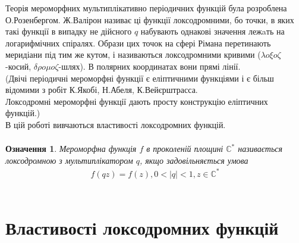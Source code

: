 \documentclass[12pt,a4paper]{article}
\begin{document}
Теорія мероморфних мультиплікативно періодичних функцій була розроблена О.Розенбергом. Ж.Валірон називає ці функції локсодромними, бо точки, в яких такі функції в випадку не дійсного $q$ набувають однакові значення лежaть на логарифмічних спіралях. Образи цих точок на сфері Рімана перетинають меридіани під тим же кутом, і називаються локсодромними кривими ($\lambda o \xi o\zeta$-косий, $\delta \rho o \mu o\zeta$-шлях). В полярних координатах вони прямі лінії.\\
(Двічі періодичні мероморфні функції є еліптичними функціями і є більш відомими з робіт К.Якобі, Н.Абеля, К.Вейєрштрасса.\\
Локсодромні мероморфні функції дають просту конструкцію еліптичних функцій.)\\
В цій роботі вивчаються властивості локсодромних функцій.
\[\begin{array}{l}
\end{array} \]

\newtheorem{ozn}{Означення}
\begin{ozn}
 Мероморфна функція $f$ в проколеній площині $\mathbb{C}^{*}$ називається локсодромною з мультиплікатором $q$, якщо задовільняється умова 
\begin{equation}\label{eq0}
\begin{array}{l}
f(qz)=f(z), 0<\vert q \vert<1, z\in \mathbb{C}^{*}
\end{array}
\end{equation}
\end{ozn}
\[\begin{array}{l}
\end{array} \]



\clearpage


\section{Властивості локсодромних функцій}
\end{document}

